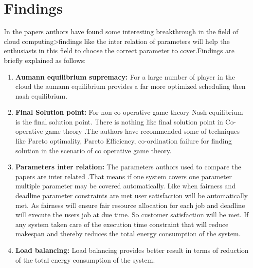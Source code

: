 \documentclass{report}
\begin{document}
\chapter{Findings}
 In the papers  authors have found some interesting breakthrough in the field of cloud computing>findings like the inter relation of parameters will help the enthusiasts in this field to choose the correct parameter to cover.Findings are briefly explained as follows:
 \begin{enumerate}
 \item \textbf{	Aumann equilibrium supremacy:} For a large number of player in the cloud the aumann equilibrium provides a far more optimized scheduling then nash equilibrium.
\item \textbf{Final Solution point:} For non co-operative game theory Nash equilibrium is the final solution point. There is nothing like final solution point in Co-operative game theory .The authors have recommended some of techniques like Pareto optimality, Pareto Efficiency, co-ordination failure for  finding solution in the scenario of co operative game theory.
\item \textbf{Parameters inter relation:} The parameters authors used to compare the papers are inter related .That means if  one system covers one parameter multiple parameter may be covered automatically. Like when fairness and deadline parameter  constraints are met user satisfaction will be automatically met. As fairness will ensure fair resource allocation for each job and deadline will execute the users job  at due time. So customer satisfaction will be met. If any system taken care of the execution time constraint that will reduce makespan and thereby reduces  the total energy consumption of the system.
\item \textbf{Load balancing:} Load  balancing provides  better result in terms of reduction of the total energy consumption of the system.

 \end{enumerate}
 
\end{document}
